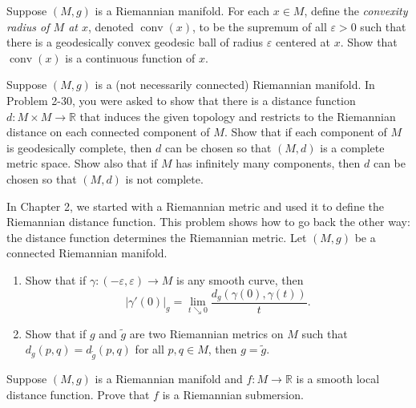 \begin{exercise}
\label{prob:convexity-radius-continuous}

Suppose $(M, g)$ is a Riemannian manifold. For each $x \in M$, define the \emph{convexity radius of $M$ at $x$}, denoted $\operatorname{conv}(x)$, to be the supremum of all $\varepsilon > 0$ such that there is a geodesically convex geodesic ball of radius $\varepsilon$ centered at $x$. Show that $\operatorname{conv}(x)$ is a continuous function of $x$.
\end{exercise}

\begin{exercise}
\label{prob:distance-complete-metric}

Suppose $(M, g)$ is a (not necessarily connected) Riemannian manifold. In Problem 2-30, you were asked to show that there is a distance function $d : M \times M \to \mathbb{R}$ that induces the given topology and restricts to the Riemannian distance on each connected component of $M$. Show that if each component of $M$ is geodesically complete, then $d$ can be chosen so that $(M, d)$ is a complete metric space. Show also that if $M$ has infinitely many components, then $d$ can be chosen so that $(M, d)$ is not complete.
\end{exercise}

\begin{exercise}
\label{prob:distance-determines-metric}

In Chapter 2, we started with a Riemannian metric and used it to define the Riemannian distance function. This problem shows how to go back the other way: the distance function determines the Riemannian metric. Let $(M, g)$ be a connected Riemannian manifold.
\begin{enumerate}
\item[(a)] Show that if $\gamma: (-\varepsilon, \varepsilon) \to M$ is any smooth curve, then
\[
|\gamma'(0)|_g = \lim_{t \searrow 0} \frac{d_g(\gamma(0), \gamma(t))}{t}.
\]
\item[(b)] Show that if $g$ and $\tilde{g}$ are two Riemannian metrics on $M$ such that $d_g(p,q) = d_{\tilde{g}}(p,q)$ for all $p,q \in M$, then $g = \tilde{g}$.
\end{enumerate}
\end{exercise}

\begin{exercise}
\label{prob:distance-function-submersion}

Suppose $(M, g)$ is a Riemannian manifold and $f : M \to \mathbb{R}$ is a smooth local distance function. Prove that $f$ is a Riemannian submersion.
\end{exercise}

